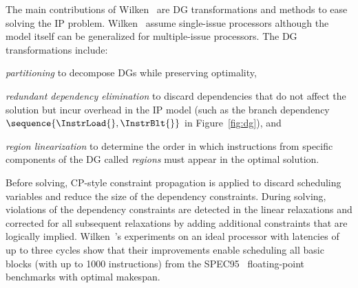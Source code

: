\documentclass[acmsmall,authorversion,nonacm]{acmart}
\begin{document}
The main contributions of Wilken~\etal{} are DG transformations and
methods to ease solving the IP problem.
Wilken~\etal{} assume single-issue processors although the model
itself can be generalized for multiple-issue processors.
The DG transformations include:
\begin{inparaitem}[]
\item \emph{partitioning} to decompose DGs while preserving
  optimality,
\item \emph{redundant dependency elimination} to discard dependencies
  that do not affect the solution but incur overhead in the IP model
  (such as the branch dependency $\sequence{\InstrLoad{},
    \InstrBlt{}}$ in Figure~\ref{fig:dg}), and
\item \emph{region linearization} to determine the order in which
  instructions from specific components of the DG called
  \emph{regions} must appear in the optimal solution.
\end{inparaitem}
Before solving, CP-style constraint propagation is applied to discard
scheduling variables and reduce the size of the dependency
constraints.
During solving, violations of the dependency constraints are detected
in the linear relaxations and corrected for all subsequent relaxations
by adding additional constraints that are logically implied.
Wilken~\etal{}'s experiments on an ideal processor with latencies of
up to three cycles show that their improvements enable scheduling all
basic blocks (with up to 1000 instructions) from the SPEC95~\cite{CPU}
floating-point benchmarks with optimal makespan.
\end{document}
